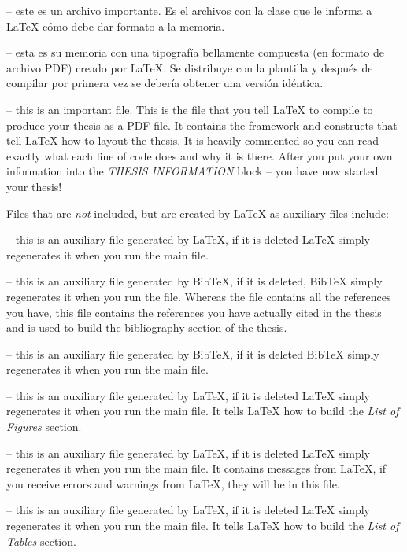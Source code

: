  -- este es un archivo importante. Es el archivos con la clase que le informa a  \LaTeX{} cómo debe dar formato a la memoria. 

 -- esta es su memoria con una tipografía bellamente compuesta (en formato de archivo PDF) creado por \LaTeX{}. Se distribuye con la plantilla y después de compilar por primera vez se debería obtener una versión idéntica.

 -- this is an important file. This is the file that you tell \LaTeX{} to compile to produce your thesis as a PDF file. It contains the framework and constructs that tell \LaTeX{} how to layout the thesis. It is heavily commented so you can read exactly what each line of code does and why it is there. After you put your own information into the \emph{THESIS INFORMATION} block -- you have now started your thesis!

Files that are \emph{not} included, but are created by \LaTeX{} as auxiliary files include:

 -- this is an auxiliary file generated by \LaTeX{}, if it is deleted \LaTeX{} simply regenerates it when you run the main  file.

 -- this is an auxiliary file generated by BibTeX, if it is deleted, BibTeX simply regenerates it when you run the  file. Whereas the  file contains all the references you have, this  file contains the references you have actually cited in the thesis and is used to build the bibliography section of the thesis.

 -- this is an auxiliary file generated by BibTeX, if it is deleted BibTeX simply regenerates it when you run the main  file.

 -- this is an auxiliary file generated by \LaTeX{}, if it is deleted \LaTeX{} simply regenerates it when you run the main  file. It tells \LaTeX{} how to build the \emph{List of Figures} section.

 -- this is an auxiliary file generated by \LaTeX{}, if it is deleted \LaTeX{} simply regenerates it when you run the main  file. It contains messages from \LaTeX{}, if you receive errors and warnings from \LaTeX{}, they will be in this  file.

 -- this is an auxiliary file generated by \LaTeX{}, if it is deleted \LaTeX{} simply regenerates it when you run the main  file. It tells \LaTeX{} how to build the \emph{List of Tables} section.

